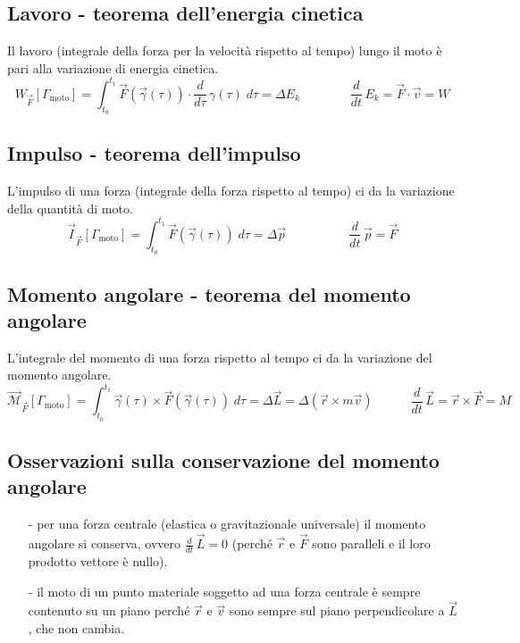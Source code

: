 \documentclass[a4paper]{article}
\newcommand\dt{\frac{d}{dt}\,}
\newcommand\dtau{\frac{d}{d\tau}\,}
\begin{document}
\subsection{Lavoro - teorema dell'energia cinetica}
Il lavoro (integrale della forza per la velocità rispetto al tempo) lungo il moto è pari alla variazione di energia cinetica.
\[W_{\vec{F}}[\Gamma_\text{moto}] = \int_{t_0}^{t_1} \vec{F}(\vec{\gamma}(\tau)) \cdot \dtau \gamma(\tau) \; d\tau = \Delta E_k \qquad \qquad \dt E_k = \vec{F} \cdot \vec{v} = W\]

\subsection{Impulso - teorema dell'impulso}
L'impulso di una forza (integrale della forza rispetto al tempo) ci da la variazione della quantità di moto.
\[\vec{I}_{\vec{F}}[\Gamma_\text{moto}] = \int_{t_0}^{t_1} \vec{F}(\vec{\gamma}(\tau)) \; d\tau = \Delta \vec{p} \qquad \qquad \quad \dt \vec{p} = \vec{F}\]

\subsection{Momento angolare - teorema del momento angolare}
L'integrale del momento di una forza rispetto al tempo ci da la variazione del momento angolare.
\[\vec{\mathcal{M}}_{\vec{F}}[\Gamma_\text{moto}] = \int_{t_0}^{t_1} \vec{\gamma}(\tau) \times \vec{F}(\vec{\gamma}(\tau)) \; d\tau = \Delta \vec{L} = \Delta (\vec{r} \times m \vec{v}) \qquad \quad \dt \vec{L} = \vec{r} \times \vec{F} = M\]

\subsection{Osservazioni sulla conservazione del momento angolare}
\begin{itemize}
	\item[-] per una forza centrale (elastica o gravitazionale universale) il momento angolare si conserva, ovvero \(\dt \vec{L} = 0\) (perché
	\(\vec{r}\) e \(\vec{F}\) sono paralleli e il loro prodotto vettore è nullo).
	\item[-] il moto di un punto materiale soggetto ad una forza centrale è sempre contenuto su un piano perché \(\vec{r}\) e \(\vec{v}\) sono
	sempre sul piano perpendicolare a \(\vec{L}\), che non cambia.
\end{itemize}


\newpage
\end{document}
